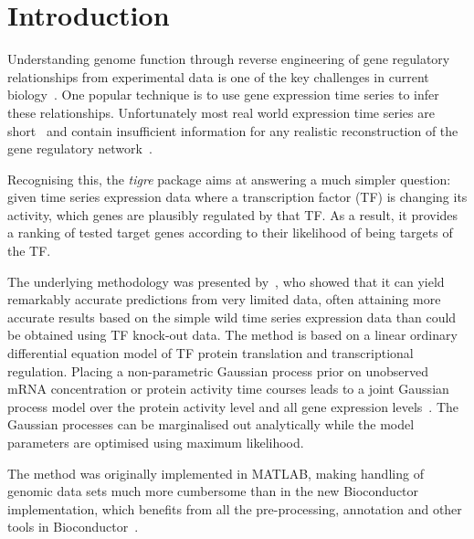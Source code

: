 \documentclass{bioinfo}
\newcommand{\tigre}{\emph{tigre}}
\begin{document}
\section{Introduction}

Understanding genome function through reverse engineering of gene
regulatory relationships from experimental data is one of the key
challenges in current biology~\citep{Bansal2007a,Bickel2009e}.  One
popular technique is to use gene expression time series to infer these
relationships.  Unfortunately most real world expression time series
are short~\citep{Ernst2005} and contain insufficient information for
any realistic reconstruction of the gene regulatory
network~\citep{Smet2010}.

Recognising this, the \tigre{} package aims at answering a much
simpler question: given time series expression data where a
transcription factor (TF) is changing its activity, which genes are
plausibly regulated by that TF.  As a result, it provides a ranking of
tested target genes according to their likelihood of being targets of
the TF.

The underlying methodology was presented by~\citet{Honkela2010PNAS},
who showed that it can yield remarkably accurate predictions from very
limited data, often attaining more accurate results based on the
simple wild time series expression data than could be obtained using
TF knock-out data.  The method is based on a linear ordinary
differential equation model of TF protein translation and
transcriptional regulation.  Placing a non-parametric Gaussian process
prior on unobserved mRNA concentration or protein activity time courses
leads to a
joint Gaussian process model over the protein activity level and all
gene expression levels~\citep{Gao2008}.  The Gaussian processes can be
marginalised out analytically while the model parameters are optimised
using maximum likelihood.

The method was originally implemented in MATLAB,
making handling of genomic data sets much more cumbersome than in the
new Bioconductor implementation, which benefits from all the
pre-processing, annotation and other tools in
Bioconductor~\citep{Gentleman2004}.

\end{document}
